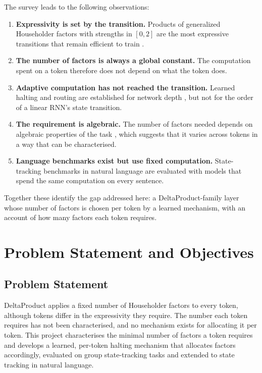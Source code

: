 The survey leads to the following observations:
\begin{enumerate}[label={(\arabic*)}, itemsep=2pt, topsep=4pt]
	\item \textbf{Expressivity is set by the transition.} Products of generalized Householder factors with strengths in $[0,2]$ are the most expressive transitions that remain efficient to train \cite{negeig, deltaproduct}.
	\item \textbf{The number of factors is always a global constant.} The computation spent on a token therefore does not depend on what the token does.
	\item \textbf{Adaptive computation has not reached the transition.} Learned halting and routing are established for network depth \cite{act, pondernet, mod}, but not for the order of a linear RNN's state transition.
	\item \textbf{The requirement is algebraic.} The number of factors needed depends on algebraic properties of the task \cite{deltaproduct, howe, larson}, which suggests that it varies across tokens in a way that can be characterised.
	\item \textbf{Language benchmarks exist but use fixed computation.} State-tracking benchmarks in natural language \cite{scone, entitytracking, propara, npncooking} are evaluated with models that spend the same computation on every sentence.
\end{enumerate}
Together these identify the gap addressed here: a DeltaProduct-family layer whose number of factors is chosen per token by a learned mechanism, with an account of how many factors each token requires.

\section{Problem Statement and Objectives}
\label{sec:problem}
\subsection{Problem Statement}
DeltaProduct applies a fixed number of Householder factors to every token, although tokens differ in the expressivity they require. The number each token requires has not been characterised, and no mechanism exists for allocating it per token. This project characterises the minimal number of factors a token requires and develops a learned, per-token halting mechanism that allocates factors accordingly, evaluated on group state-tracking tasks and extended to state tracking in natural language.

